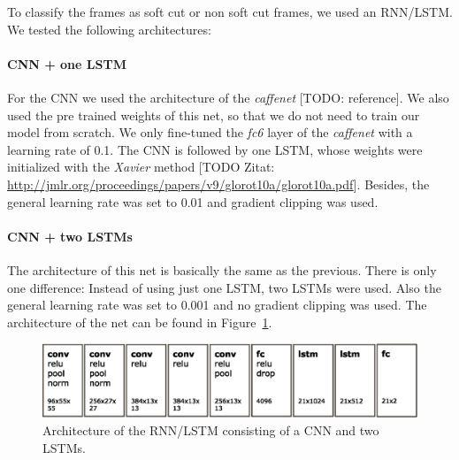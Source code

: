 To classify the frames as soft cut or non soft cut frames, we used an RNN/LSTM.
We tested the following architectures:

\paragraph{CNN + one LSTM}
For the CNN we used the architecture of the \textit{caffenet} [TODO: reference].
We also used the pre trained weights of this net, so that we do not need to train our model from scratch.
We only fine-tuned the \textit{fc6} layer of the \textit{caffenet} with a learning rate of 0.1.
The CNN is followed by one LSTM, whose weights were initialized with the \textit{Xavier} method [TODO Zitat: \url{http://jmlr.org/proceedings/papers/v9/glorot10a/glorot10a.pdf}].
Besides, the general learning rate was set to 0.01 and gradient clipping was used.

\paragraph{CNN + two LSTMs}
The architecture of this net is basically the same as the previous.
There is only one difference: Instead of using just one LSTM, two LSTMs were used.
Also the general learning rate was set to 0.001 and no gradient clipping was used.
The architecture of the net can be found in Figure~\ref{fig:net_architecture}.
\begin{figure}[!htb]
	\centering
	\includegraphics[scale=.5]{images/net_architecture.eps}
	\caption{Architecture of the RNN/LSTM consisting of a CNN and two LSTMs.}
	\label{fig:net_architecture}
\end{figure}

